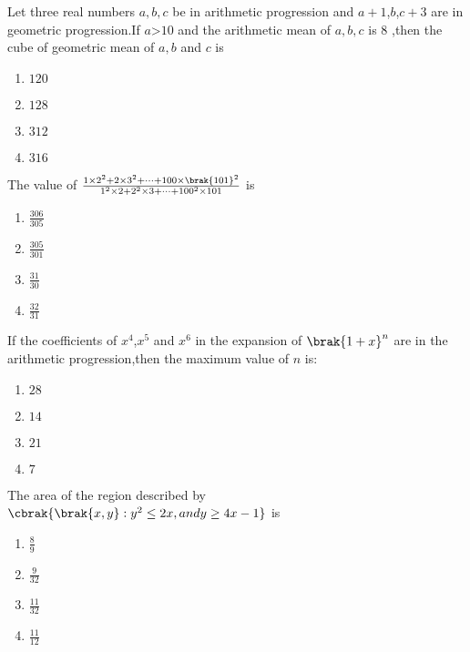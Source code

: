 \iffalse
\title{27-jan-2024 shift-2}
\author{EE24BTECH11060}
\section{mcq-single}
\fi
    \item Let three real numbers $a,b,c$ be in arithmetic progression and $a+1$,$b$,$c+3$ are in geometric progression.If $a$\textgreater $10$ and the arithmetic mean of $a,b,c$ is $8$ ,then the cube of geometric mean of $a,b$ and $c$ is
    \begin{enumerate}
        \item $120$
        \item $128$
        \item $312$
        \item $316$
    \end{enumerate}
    \item The value of $\frac{1\times2^2+2\times3^2+\dots+100\times\brak{101}^2}{1^2\times2+2^2\times3+\dots+100^2\times101}$ is
    \begin{enumerate}
        \item $\frac{306}{305}$
        \item $\frac{305}{301}$
        \item $\frac{31}{30}$
        \item $\frac{32}{31}$
    \end{enumerate}
    \item If the coefficients of $x^4$,$x^5$ and $x^6$ in the expansion of $\brak{1+x}^n$ are in the arithmetic progression,then the maximum value of $n$ is:
    \begin{enumerate}
        \item $28$
        \item $14$
        \item $21$
        \item $7$
    \end{enumerate}
    \item The area  of the region described by $\cbrak{\brak{x,y}:y^2\leq 2x,and y\geq4x-1}$ is 
    \begin{enumerate}
        \item $\frac{8}{9}$
        \item $\frac{9}{32}$
        \item $\frac{11}{32}$
        \item $\frac{11}{12}$
    \end{enumerate}
